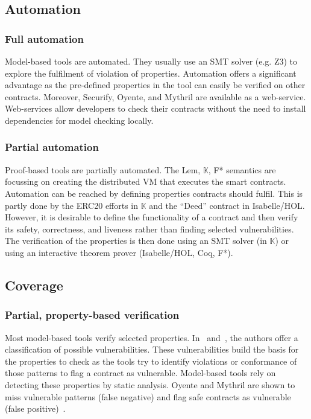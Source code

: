 \subsection{Automation} 
\subsubsection{Full automation}
Model-based tools are automated. They usually use an SMT solver (e.g. Z3) to explore the fulfilment of violation of properties. Automation offers a significant advantage as the pre-defined properties in the tool can easily be verified on other contracts. Moreover, Securify, Oyente, and Mythril are available as a web-service. Web-services allow developers to check their contracts without the need to install dependencies for model checking locally.

\subsubsection{Partial automation}
Proof-based tools are partially automated. The Lem, $\mathbb{K}$, F* semantics are focussing on creating the distributed VM that executes the smart contracts. Automation can be reached by defining properties contracts should fulfil. This is partly done by the ERC20 efforts in $\mathbb{K}$ and the ``Deed'' contract in Isabelle/HOL. However, it is desirable to define the functionality of a contract and then verify its safety, correctness, and liveness rather than finding selected vulnerabilities. The verification of the properties is then done using an SMT solver (in $\mathbb{K}$) or using an interactive theorem prover (Isabelle/HOL, Coq, F*).

\subsection{Coverage} 
\subsubsection{Partial, property-based verification}
Most model-based tools verify selected properties. In~\cite{Atzei2017} and~\cite{Luu2016}, the authors offer a classification of possible vulnerabilities. These vulnerabilities build the basis for the properties to check as the tools try to identify violations or conformance of those patterns to flag a contract as vulnerable.
Model-based tools rely on detecting these properties by static analysis. 
Oyente and Mythril are shown to miss vulnerable patterns (false negative) and flag safe contracts as vulnerable (false positive)~\cite{Tsankov2017}.


